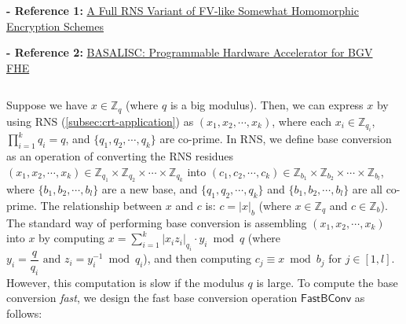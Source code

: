 \noindent \textbf{- Reference 1:} 
\href{https://eprint.iacr.org/2016/510}{A Full RNS Variant of FV-like Somewhat Homomorphic Encryption Schemes}~\cite{rns-bfv}

\noindent \textbf{- Reference 2:} 
\href{https://eprint.iacr.org/2022/657}{BASALISC: Programmable Hardware Accelerator for BGV FHE}~\cite{rns-bfv2}

$ $


Suppose we have $x \in \mathbb{Z}_q$ (where $q$ is a big modulus). Then, we can express $x$ by using RNS (\autoref{subsec:crt-application}) as $(x_1, x_2, \cdots, x_k)$, where each $x_i \in \mathbb{Z}_{q_i}$, $\prod\limits_{i=1}^k q_i = q$, and $\{q_1, q_2, \cdots, q_k\}$ are co-prime. In RNS, we define base conversion as an operation of converting the RNS residues $(x_1, x_2, \cdots, x_k) \in \mathbb{Z}_{q_1} \times \mathbb{Z}_{q_2} \times \cdots \times \mathbb{Z}_{q_k}$ into $(c_1, c_2, \cdots, c_k) \in \mathbb{Z}_{b_1} \times \mathbb{Z}_{b_2} \times \cdots \times \mathbb{Z}_{b_l}$, where $\{b_1, b_2, \cdots, b_l\}$ are a new base, and $\{q_1, q_2, \cdots, q_k\}$ and $\{b_1, b_2, \cdots, b_l\}$ are all co-prime. The relationship between $x$ and $c$ is: $c = |x|_b$ (where $x \in \mathbb{Z}_{q}$ and $c \in \mathbb{Z}_b$). The standard way of performing base conversion is assembling $(x_1, x_2, \cdots, x_k)$ into $x$ by computing $x = \sum\limits_{i=1}^k |x_i z_i|_{q_i} \cdot y_i \bmod q$ (where $y_i = \dfrac{q}{q_i} \text{ and } z_i = y_i^{-1} \bmod q_i$), and then computing $c_j \equiv x \bmod b_j$ for $j \in [1, l]$. However, this computation is slow if the modulus $q$ is large. To compute the base conversion \textit{fast}, we design the fast base conversion operation $\textsf{FastBConv}$ as follows: 


